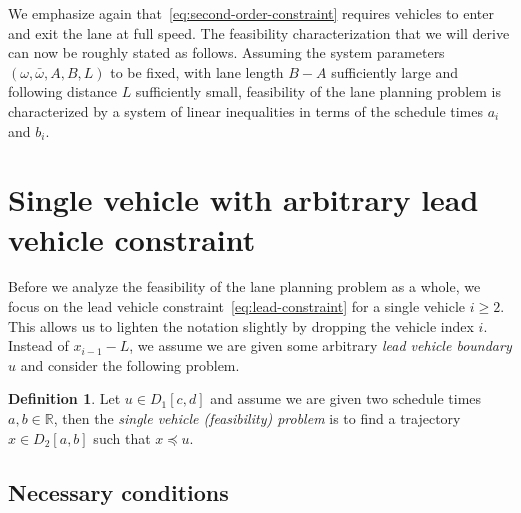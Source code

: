 \documentclass{report}
\theoremstyle{definition}
\newtheorem{define}{Definition}[chapter]
\theoremstyle{plain}
\begin{document}
We emphasize again that~\eqref{eq:second-order-constraint} requires vehicles to
enter and exit the lane at full speed.
%
The feasibility characterization that we will derive can now be roughly stated
as follows. Assuming the system parameters $(\omega, \bar{\omega},A,B,L)$ to be
fixed, with lane length $B-A$ sufficiently large and following distance $L$
sufficiently small, feasibility of the lane planning problem is characterized by
a system of linear inequalities in terms of the schedule times $a_{i}$ and
$b_{i}$.



\section{Single vehicle with arbitrary lead vehicle constraint}\label{sec:single-vehicle-problem}

Before we analyze the feasibility of the lane planning problem as a whole, we
focus on the lead vehicle constraint~\eqref{eq:lead-constraint} for a single
vehicle $i \geq 2$.
%
This allows us to lighten the notation slightly by dropping the vehicle index
$i$. Instead of $x_{i-1} - L$, we assume we are given some arbitrary \emph{lead vehicle boundary}
$u$ and consider the following problem.

\begin{define}
  Let $u \in D_{1}[c, d]$ and assume we are given two schedule times
  $a,b \in \mathbb{R}$, then the \emph{single vehicle (feasibility) problem} is to find
  a trajectory $x \in D_{2}[a,b]$ such that $x \preceq u$.
\end{define}

\subsection{Necessary conditions}
\end{document}
